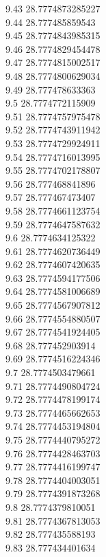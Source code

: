 {9.43	28.7774873285227\\
9.44	28.777485859543\\
9.45	28.7774843985315\\
9.46	28.7774829454478\\
9.47	28.7774815002517\\
9.48	28.7774800629034\\
9.49	28.777478633363\\
9.5	28.7774772115909\\
9.51	28.7774757975478\\
9.52	28.7774743911942\\
9.53	28.7774729924911\\
9.54	28.7774716013995\\
9.55	28.7774702178807\\
9.56	28.777468841896\\
9.57	28.777467473407\\
9.58	28.7774661123754\\
9.59	28.7774647587632\\
9.6	28.7774634125322\\
9.61	28.7774620736449\\
9.62	28.7774607420635\\
9.63	28.7774594177506\\
9.64	28.7774581006689\\
9.65	28.7774567907812\\
9.66	28.7774554880507\\
9.67	28.7774541924405\\
9.68	28.777452903914\\
9.69	28.7774516224346\\
9.7	28.7774503479661\\
9.71	28.7774490804724\\
9.72	28.7774478199174\\
9.73	28.7774465662653\\
9.74	28.7774453194804\\
9.75	28.7774440795272\\
9.76	28.7774428463703\\
9.77	28.7774416199747\\
9.78	28.7774404003051\\
9.79	28.7774391873268\\
9.8	28.7774379810051\\
9.81	28.7774367813053\\
9.82	28.777435588193\\
9.83	28.777434401634\\
}
